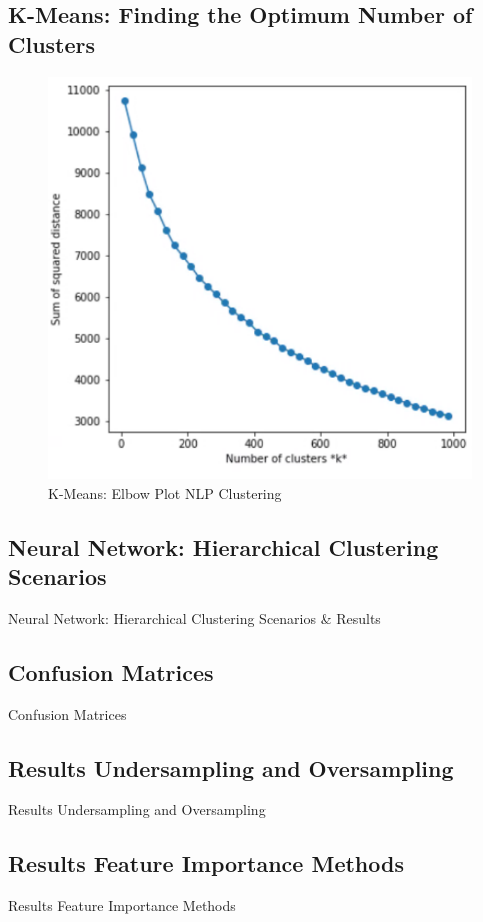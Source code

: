 \subsection{K-Means: Finding the Optimum Number of Clusters}
\label{ssec:Kmeans}
\begin{figure}[h]
    \centering
    \includegraphics[width=.4\linewidth]{ThesisTemplate/Images/K-means.png}
    \caption{K-Means: Elbow Plot NLP Clustering}
\end{figure}

\subsection{Neural Network: Hierarchical Clustering Scenarios}
\label{ssec:hieclu}
\begin{table}[H]
\begin{footnotesize}

\end{footnotesize}
\caption{\label{tab:hieclu} Neural Network: Hierarchical Clustering Scenarios \& Results}
\end{table}

\subsection{Confusion Matrices}
\label{ssec:cm}
\begin{table}[H]
\begin{footnotesize}

\end{footnotesize}
\caption{\label{tab:cm} Confusion Matrices}
\end{table}

\subsection{Results Undersampling and Oversampling}
\label{ssec:ruo}
\begin{table}[H]
\begin{footnotesize}

\end{footnotesize}
\caption{\label{tab:ruo} Results Undersampling and Oversampling}
\end{table}

\subsection{Results Feature Importance Methods}
\label{ssec:fi}
\begin{table}[H]
\begin{footnotesize}

\end{footnotesize}
\caption{\label{tab:fi} Results Feature Importance Methods}
\end{table}




